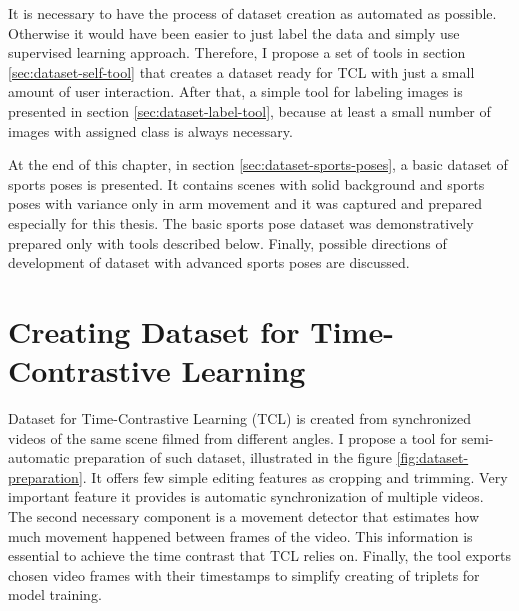 It is necessary to have the process of dataset creation as automated as possible. Otherwise it would have been easier to just label the data and simply use supervised learning approach. Therefore, I propose a set of tools in section \ref{sec:dataset-self-tool} that creates a dataset ready for TCL with just a small amount of user interaction. After that, a simple tool for labeling images is presented in section \ref{sec:dataset-label-tool}, because at least a small number of images with assigned class is always necessary.

At the end of this chapter, in section \ref{sec:dataset-sports-poses}, a basic dataset of sports poses is presented. It contains scenes with solid background and sports poses with variance only in arm movement and it was captured and prepared especially for this thesis. The basic sports pose dataset was demonstratively prepared only with tools described below. Finally, possible directions of development of dataset with advanced sports poses are discussed.

\section{\label{sec:dataset-self-tool}Creating Dataset for Time-Contrastive Learning}

Dataset for Time-Contrastive Learning (TCL) is created from synchronized videos of the same scene filmed from different angles. I propose a tool for semi-automatic preparation of such dataset, illustrated in the figure \ref{fig:dataset-preparation}. It offers few simple editing features as cropping and trimming. Very important feature it provides is automatic synchronization of multiple videos. The second necessary component is a movement detector that estimates how much movement happened between frames of the video. This information is essential to achieve the time contrast that TCL relies on. Finally, the tool exports chosen video frames with their timestamps to simplify creating of triplets for model training.

